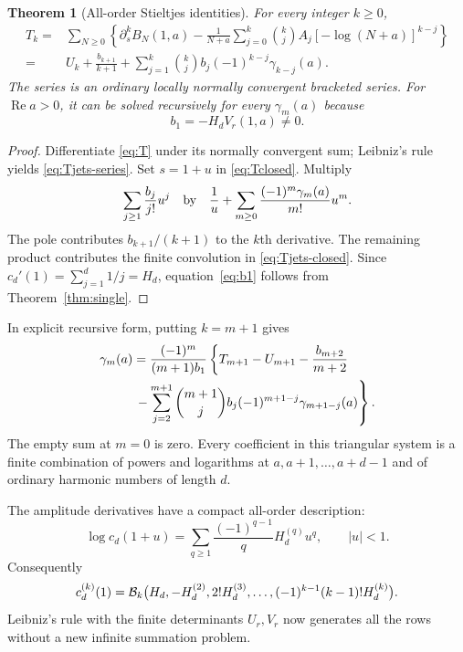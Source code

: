 \documentclass[11pt,letterpaper]{article}
\numberwithin{equation}{section}
\newtheorem{theorem}{Theorem}[section]
\theoremstyle{definition}\newtheorem{definition}[theorem]{Definition}
\theoremstyle{remark}\newtheorem{remark}[theorem]{Remark}
\DeclareMathOperator{\Rea}{Re}
\begin{document}
\begin{theorem}[All-order Stieltjes identities]\label{thm:jets}
For every integer $k\ge0$,
\begin{align}
 T_k
 ={}&\sum_{N\ge0}\left\{\partial_s^kB_N(1,a)
   -\frac1{N+a}\sum_{j=0}^k\binom kj A_j
                   [-\log(N+a)]^{k-j}\right\}\label{eq:Tjets-series}\\
 ={}&U_k+\frac{b_{k+1}}{k+1}
   +\sum_{j=1}^k\binom kj b_j(-1)^{k-j}\gamma_{k-j}(a).
 \label{eq:Tjets-closed}
\end{align}
The series is an ordinary locally normally convergent bracketed series.
For $\Rea a>0$, it can be solved recursively for every $\gamma_m(a)$ because
\begin{equation}\label{eq:b1}
 b_1=-H_dV_r(1,a)\ne0.
\end{equation}
\end{theorem}
\begin{proof}
Differentiate \eqref{eq:T} under its normally convergent sum; Leibniz's
rule yields \eqref{eq:Tjets-series}. Set $s=1+u$ in
\eqref{eq:Tclosed}. Multiply
\[
 \sum_{j\ge1}\frac{b_j}{j!}u^j
 \quad\hbox{by}\quad
 \frac1u+\sum_{m\ge0}\frac{(-1)^m\gamma_m(a)}{m!}u^m.
\]
The pole contributes $b_{k+1}/(k+1)$ to the $k$th derivative. The
remaining product contributes the finite convolution in
\eqref{eq:Tjets-closed}. Since
$c_d'(1)=\sum_{j=1}^d1/j=H_d$, equation~\eqref{eq:b1} follows from
Theorem~\ref{thm:single}.
\end{proof}

In explicit recursive form, putting $k=m+1$ gives
\begin{align}
 \gamma_m(a)=\frac{(-1)^m}{(m+1)b_1}
 \left\{T_{m+1}-U_{m+1}-\frac{b_{m+2}}{m+2}\right.\qquad\notag\\
 \left.{}-\sum_{j=2}^{m+1}\binom{m+1}{j}
       b_j(-1)^{m+1-j}\gamma_{m+1-j}(a)\right\}.
 \label{eq:gamma-invert}
\end{align}
The empty sum at $m=0$ is zero. Every coefficient in this triangular
system is a finite combination of powers and logarithms at $a,a+1,\ldots,a+d-1$
and of ordinary harmonic numbers of length $d$.

The amplitude derivatives have a compact all-order description:
\begin{equation}\label{eq:cd-bell}
 \log c_d(1+u)=\sum_{q\ge1}\frac{(-1)^{q-1}}qH_d^{(q)}u^q,
 \qquad |u|<1.
\end{equation}
Consequently
\[
 c_d^{(k)}(1)=\mathcal B_k\bigl(H_d,-H_d^{(2)},2!H_d^{(3)},\ldots,
                  (-1)^{k-1}(k-1)!H_d^{(k)}\bigr).
\]
Leibniz's rule with the finite determinants $U_r,V_r$ now generates
all the rows without a new infinite summation problem.
\end{document}
